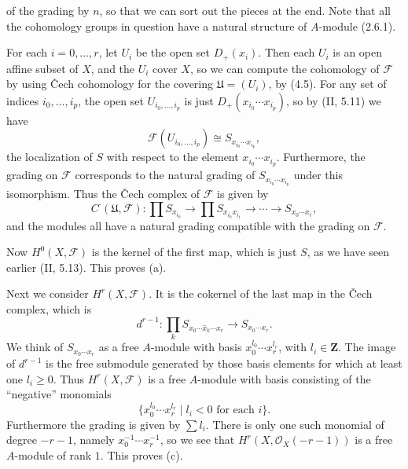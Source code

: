 
\DeclareMathOperator{\Spec}{Spec}


of the grading by $n$, so that we can sort out the pieces at the end. Note
that all the cohomology groups in question have a natural structure of
$A$-module (2.6.1).

For each $i = 0, \ldots, r$, let $U_i$ be the open set $D_+(x_i)$. Then each
$U_i$ is an open affine subset of $X$, and the $U_i$ cover $X$, so we can
compute the cohomology of $\mathcal{F}$ by using \v{C}ech cohomology for the
covering $\mathfrak{U} = (U_i)$, by (4.5). For any set of indices
$i_0, \ldots, i_p$, the open set $U_{i_0, \ldots, i_p}$ is just
$D_+(x_{i_0} \cdots x_{i_p})$, so by (II, 5.11) we have
\[
  \mathcal{F}(U_{i_0, \ldots, i_p}) \cong S_{x_{i_0} \cdots x_{i_p}},
\]
the localization of $S$ with respect to the element $x_{i_0} \cdots x_{i_p}$.
Furthermore, the grading on $\mathcal{F}$ corresponds to the natural grading
of $S_{x_{i_0} \cdots x_{i_p}}$ under this isomorphism. Thus the \v{C}ech
complex of $\mathcal{F}$ is given by
\[
  C^{\boldsymbol{\cdot}}(\mathfrak{U}, \mathcal{F}) :
    \prod S_{x_{i_0}} \to \prod S_{x_{i_0} x_{i_1}} \to \cdots \to
    S_{x_0 \cdots x_r},
\]
and the modules all have a natural grading compatible with the grading on
$\mathcal{F}$.

Now $H^0(X, \mathcal{F})$ is the kernel of the first map, which is just $S$,
as we have seen earlier (II, 5.13). This proves (a).

Next we consider $H^r(X, \mathcal{F})$. It is the cokernel of the last map
in the \v{C}ech complex, which is
\[
  d^{r-1} : \prod_k S_{x_0 \cdots \hat{x}_k \cdots x_r} \to
    S_{x_0 \cdots x_r}.
\]
We think of $S_{x_0 \cdots x_r}$ as a free $A$-module with basis
$x_0^{l_0} \cdots x_r^{l_r}$, with $l_i \in \mathbf{Z}$. The image of
$d^{r-1}$ is the free submodule generated by those basis elements for which
at least one $l_i \ge 0$. Thus $H^r(X, \mathcal{F})$ is a free $A$-module
with basis consisting of the ``negative'' monomials
\[
  \{ x_0^{l_0} \cdots x_r^{l_r} \mid l_i < 0 \text{ for each } i \}.
\]
Furthermore the grading is given by $\sum l_i$. There is only one such
monomial of degree $-r-1$, namely $x_0^{-1} \cdots x_r^{-1}$, so we see that
$H^r(X, \mathcal{O}_X(-r-1))$ is a free $A$-module of rank $1$. This proves
(c).

